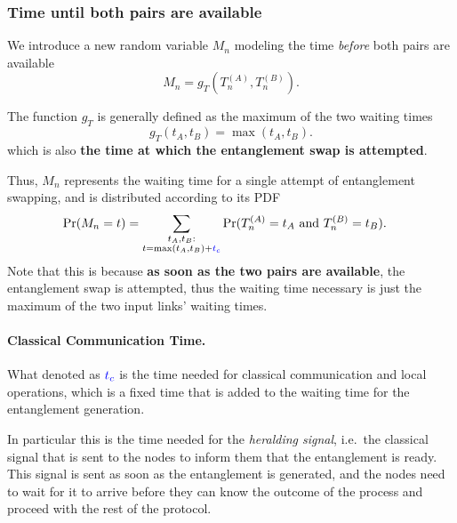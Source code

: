 \documentclass{masterthesis}
\begin{document}
\subsubsection*{Time until both pairs are available}

We introduce a new random variable $M_n$ modeling the time \textit{before} both pairs are available
\begin{equation}\label{eq:waiting_time_pair}
    M_n = g_T(T_n^{(A)} , T_n^{(B)}) .
\end{equation}

The function $g_T$ is generally defined as the maximum of the two waiting times
\begin{equation}\label{eq:waiting_time_pair_max}
    g_T(t_A, t_B) = \max(t_A, t_B).
\end{equation}
which is also \textbf{the time at which the entanglement swap is attempted}. 

Thus, $M_n$ represents the waiting time for a single attempt of entanglement swapping, and is distributed according to its PDF
\begin{align}\label{eq:pdf_waiting_time_pair}
    \Pr(M_n = t) &= \sum_{\substack{t_A, t_B: \\ t = \max(t_A, t_B) + \textcolor{blue}{t_c}}} \Pr(T_n^{(A)} = t_A \text{ and } T_n^{(B)} = t_B) .
\end{align}
Note that this is because \textbf{as soon as the two pairs are available}, the entanglement swap is attempted, thus the waiting time necessary is just the maximum of the two input links' waiting times.

\paragraph*{Classical Communication Time.}

What denoted as $\textcolor{blue}{t_c}$ is the time needed for classical communication and local operations, which is a fixed time that is added to the waiting time for the entanglement generation.

In particular this is the time needed for the \textit{heralding signal}, i.e.\ the classical signal that is sent to the nodes to inform them that the entanglement is ready. This signal is sent as soon as the entanglement is generated, and the nodes need to wait for it to arrive before they can know the outcome of the process and proceed with the rest of the protocol.
\end{document}
